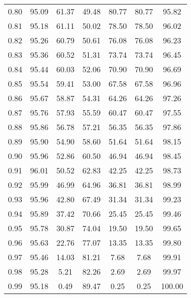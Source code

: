 \begin{tabular}{|c|c|c|c|c|c|c|}
      0.80 &     95.09 &     61.37 &      49.48 &   80.77 &      80.77 &         95.82 \\
      0.81 &     95.18 &     61.11 &      50.02 &   78.50 &      78.50 &         96.02 \\
      0.82 &     95.26 &     60.79 &      50.61 &   76.08 &      76.08 &         96.23 \\
      0.83 &     95.36 &     60.52 &      51.31 &   73.74 &      73.74 &         96.45 \\
      0.84 &     95.44 &     60.03 &      52.06 &   70.90 &      70.90 &         96.69 \\
      0.85 &     95.54 &     59.41 &      53.00 &   67.58 &      67.58 &         96.96 \\
      0.86 &     95.67 &     58.87 &      54.31 &   64.26 &      64.26 &         97.26 \\
      0.87 &     95.76 &     57.93 &      55.59 &   60.47 &      60.47 &         97.55 \\
      0.88 &     95.86 &     56.78 &      57.21 &   56.35 &      56.35 &         97.86 \\
      0.89 &     95.90 &     54.90 &      58.60 &   51.64 &      51.64 &         98.15 \\
      0.90 &     95.96 &     52.86 &      60.50 &   46.94 &      46.94 &         98.45 \\
      0.91 &     96.01 &     50.52 &      62.83 &   42.25 &      42.25 &         98.73 \\
      0.92 &     95.99 &     46.99 &      64.96 &   36.81 &      36.81 &         98.99 \\
      0.93 &     95.96 &     42.80 &      67.49 &   31.34 &      31.34 &         99.23 \\
      0.94 &     95.89 &     37.42 &      70.66 &   25.45 &      25.45 &         99.46 \\
      0.95 &     95.78 &     30.87 &      74.04 &   19.50 &      19.50 &         99.65 \\
      0.96 &     95.63 &     22.76 &      77.07 &   13.35 &      13.35 &         99.80 \\
      0.97 &     95.46 &     14.03 &      81.21 &    7.68 &       7.68 &         99.91 \\
      0.98 &     95.28 &      5.21 &      82.26 &    2.69 &       2.69 &         99.97 \\
      0.99 &     95.18 &      0.49 &      89.47 &    0.25 &       0.25 &        100.00 \\
\bottomrule
\end{tabular}
